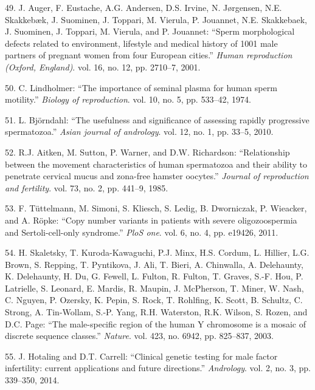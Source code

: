 \documentclass[12pt,a4paper,twoside]{ugathesis}
\theoremstyle{definition}
\theoremstyle{definition}
\theoremstyle{definition}
\theoremstyle{remark}
\begin{document}
\hypertarget{ref-Auger2001}{}
49. J. Auger, F. Eustache, A.G. Andersen, D.S. Irvine, N. Jørgensen,
N.E. Skakkebæk, J. Suominen, J. Toppari, M. Vierula, P. Jouannet, N.E.
Skakkebaek, J. Suominen, J. Toppari, M. Vierula, and P. Jouannet:
``Sperm morphological defects related to environment, lifestyle and
medical history of 1001 male partners of pregnant women from four
European cities.'' \emph{Human reproduction (Oxford, England)}. vol. 16,
no. 12, pp. 2710--7, 2001.

\hypertarget{ref-Lindholmer1974}{}
50. C. Lindholmer: ``The importance of seminal plasma for human sperm
motility.'' \emph{Biology of reproduction}. vol. 10, no. 5, pp. 533--42,
1974.

\hypertarget{ref-Bjorndahl2010}{}
51. L. Björndahl: ``The usefulness and significance of assessing rapidly
progressive spermatozoa.'' \emph{Asian journal of andrology}. vol. 12,
no. 1, pp. 33--5, 2010.

\hypertarget{ref-Aitken1985}{}
52. R.J. Aitken, M. Sutton, P. Warner, and D.W. Richardson:
``Relationship between the movement characteristics of human spermatozoa
and their ability to penetrate cervical mucus and zona-free hamster
oocytes.'' \emph{Journal of reproduction and fertility}. vol. 73, no. 2,
pp. 441--9, 1985.

\hypertarget{ref-Tuttelmann2011}{}
53. F. Tüttelmann, M. Simoni, S. Kliesch, S. Ledig, B. Dworniczak, P.
Wieacker, and A. Röpke: ``Copy number variants in patients with severe
oligozoospermia and Sertoli-cell-only syndrome.'' \emph{PloS one}. vol.
6, no. 4, pp. e19426, 2011.

\hypertarget{ref-Skaletsky2003}{}
54. H. Skaletsky, T. Kuroda-Kawaguchi, P.J. Minx, H.S. Cordum, L.
Hillier, L.G. Brown, S. Repping, T. Pyntikova, J. Ali, T. Bieri, A.
Chinwalla, A. Delehaunty, K. Delehaunty, H. Du, G. Fewell, L. Fulton, R.
Fulton, T. Graves, S.-F. Hou, P. Latrielle, S. Leonard, E. Mardis, R.
Maupin, J. McPherson, T. Miner, W. Nash, C. Nguyen, P. Ozersky, K.
Pepin, S. Rock, T. Rohlfing, K. Scott, B. Schultz, C. Strong, A.
Tin-Wollam, S.-P. Yang, R.H. Waterston, R.K. Wilson, S. Rozen, and D.C.
Page: ``The male-specific region of the human Y chromosome is a mosaic
of discrete sequence classes.'' \emph{Nature}. vol. 423, no. 6942, pp.
825--837, 2003.

\hypertarget{ref-Hotaling2014}{}
55. J. Hotaling and D.T. Carrell: ``Clinical genetic testing for male
factor infertility: current applications and future directions.''
\emph{Andrology}. vol. 2, no. 3, pp. 339--350, 2014.
\end{document}

